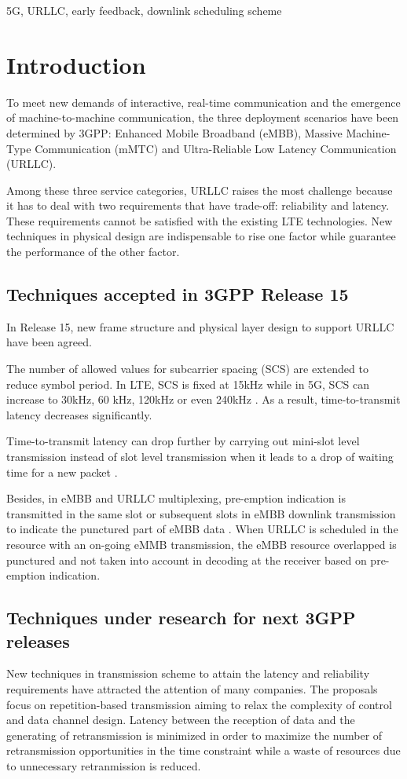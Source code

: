 \documentclass[conference]{IEEEtran}
\begin{document}
\begin{IEEEkeywords}
5G, URLLC, early feedback, downlink scheduling scheme 
\end{IEEEkeywords}

\section{Introduction}
To meet new demands of interactive, real-time communication and the emergence of machine-to-machine communication, the three deployment scenarios have been determined by 3GPP: Enhanced Mobile Broadband (eMBB), Massive Machine-Type Communication (mMTC) and Ultra-Reliable Low Latency Communication (URLLC). 

Among these three service categories, URLLC raises the most challenge because it has to deal with two requirements that have trade-off: reliability and latency. These requirements cannot be satisfied with the existing LTE technologies. New techniques in physical design are indispensable to rise one factor while guarantee the performance of the other factor.

\subsection{Techniques accepted in 3GPP Release 15}\label{IAA}
In Release 15, new frame structure and physical layer design to support URLLC have been agreed.

The number of allowed values for subcarrier spacing (SCS) are extended to reduce symbol period. In LTE, SCS is fixed at 15kHz while in 5G, SCS can increase to 30kHz, 60 kHz, 120kHz or even 240kHz \cite{ad2}. As a result, time-to-transmit latency decreases significantly.

Time-to-transmit latency can drop further by carrying out mini-slot level transmission instead of slot level transmission when it leads to a drop of waiting time for a new packet \cite{ad3}.

Besides, in eMBB and URLLC multiplexing, pre-emption indication is transmitted in the same slot or subsequent slots in eMBB downlink transmission to indicate the punctured part of eMBB data \cite{ad4}. When URLLC is scheduled in the resource with an on-going eMMB transmission, the eMBB resource overlapped is punctured and not taken into account in decoding at the receiver based on pre-emption indication. 

\subsection{Techniques under research for next 3GPP releases}\label{IBB}
New techniques in transmission scheme to attain the latency and reliability requirements have attracted the attention of many companies. The proposals focus on repetition-based transmission aiming to relax the complexity of control and data channel design. Latency between the reception of data and the generating of retransmission is minimized in order to maximize the number of retransmission opportunities in the time constraint while a waste of resources due to unnecessary retranmission is reduced.
\end{document}
